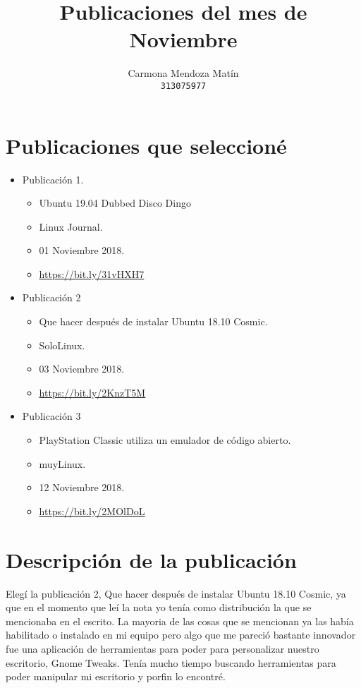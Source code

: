 \documentclass[11pt, a4paper]{report}
\begin{document}
\title{Publicaciones del mes de Noviembre}
\author{
  Carmona Mendoza Mat\'in\\
  \texttt{313075977}
}
\date{}
\maketitle

\section*{Publicaciones que seleccioné}
\begin{itemize}

\item Publicación 1.
  \begin{itemize}
  \item Ubuntu 19.04 Dubbed Disco Dingo
  \item Linux Journal.
  \item 01 Noviembre 2018.
  \item \url{https://bit.ly/31vHXH7}
  \end{itemize}
  
\item Publicación 2
  \begin{itemize}
  \item Que hacer después de instalar Ubuntu 18.10 Cosmic.
  \item SoloLinux.
  \item 03 Noviembre 2018. 
  \item \url{https://bit.ly/2KnzT5M}
  \end{itemize}

\item Publicación 3
  \begin{itemize}
  \item PlayStation Classic utiliza un emulador de código abierto.
  \item muyLinux.
  \item 12 Noviembre 2018.
  \item \url{https://bit.ly/2MOlDoL}
  \end{itemize}
\end{itemize}  


\section*{Descripción de la publicación}
Elegí la publicación 2, Que hacer después de instalar Ubuntu 18.10 Cosmic, ya
que en el momento que leí la nota yo tenía como distribución la que se
mencionaba en el escrito. La mayoria de las cosas que se mencionan ya las había
habilitado o instalado en mi equipo pero algo que me pareció bastante innovador
fue una aplicación de herramientas para poder para personalizar nuestro
escritorio, Gnome Tweaks. Tenía mucho tiempo buscando herramientas para poder
manipular mi escritorio y porfin lo encontré. \\
\end{document}

